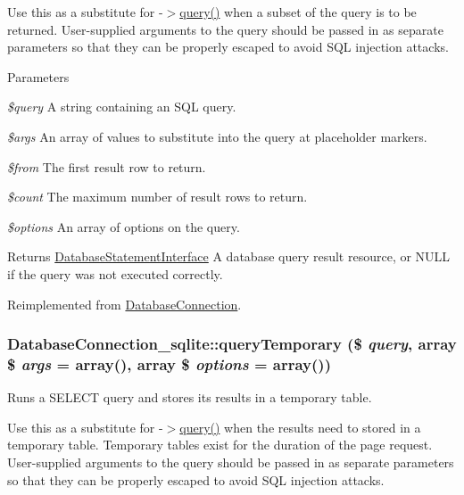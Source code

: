 Use this as a substitute for -\/$>$\hyperlink{classDatabaseConnection_aff564097281c4496e9d10cb1bccbe98d}{query()} when a subset of the query is to be returned. User-\/supplied arguments to the query should be passed in as separate parameters so that they can be properly escaped to avoid SQL injection attacks.


\begin{DoxyParams}{Parameters}
\item[{\em \$query}]A string containing an SQL query. \item[{\em \$args}]An array of values to substitute into the query at placeholder markers. \item[{\em \$from}]The first result row to return. \item[{\em \$count}]The maximum number of result rows to return. \item[{\em \$options}]An array of options on the query.\end{DoxyParams}
\begin{DoxyReturn}{Returns}
\hyperlink{interfaceDatabaseStatementInterface}{DatabaseStatementInterface} A database query result resource, or NULL if the query was not executed correctly. 
\end{DoxyReturn}


Reimplemented from \hyperlink{classDatabaseConnection_a1c97c77517b969270bb92c5c7e022a5d}{DatabaseConnection}.\hypertarget{classDatabaseConnection__sqlite_a547c5fcee9fa8ef98e15f61ab83be6be}{
\subsubsection[{queryTemporary}]{\setlength{\rightskip}{0pt plus 5cm}DatabaseConnection\_\-sqlite::queryTemporary (\$ {\em query}, \/  array \$ {\em args} = {\ttfamily array()}, \/  array \$ {\em options} = {\ttfamily array()})}}
\label{classDatabaseConnection__sqlite_a547c5fcee9fa8ef98e15f61ab83be6be}
Runs a SELECT query and stores its results in a temporary table.

Use this as a substitute for -\/$>$\hyperlink{classDatabaseConnection_aff564097281c4496e9d10cb1bccbe98d}{query()} when the results need to stored in a temporary table. Temporary tables exist for the duration of the page request. User-\/supplied arguments to the query should be passed in as separate parameters so that they can be properly escaped to avoid SQL injection attacks.


